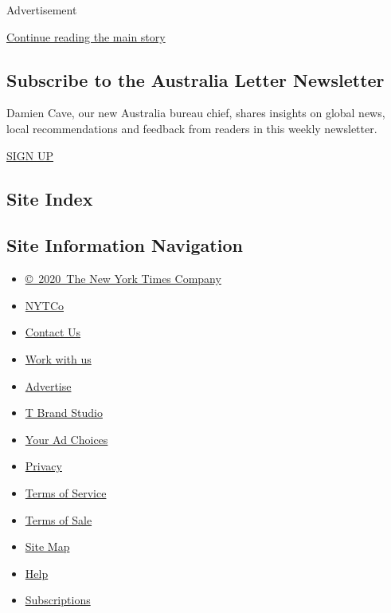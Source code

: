 Advertisement

\protect\hyperlink{after-mktg}{Continue reading the main story}

\hypertarget{subscribe-to-the-australia-letter-newsletter}{%
\subsection{Subscribe to the Australia Letter
Newsletter}\label{subscribe-to-the-australia-letter-newsletter}}

Damien Cave, our new Australia bureau chief, shares insights on global
news, local recommendations and feedback from readers in this weekly
newsletter.

\href{/newsletters/signup/AUST}{SIGN UP}

\hypertarget{site-index}{%
\subsection{Site Index}\label{site-index}}

\hypertarget{site-information-navigation}{%
\subsection{Site Information
Navigation}\label{site-information-navigation}}

\begin{itemize}
\tightlist
\item
  \href{https://help.nytimes.com/hc/en-us/articles/115014792127-Copyright-notice}{©~2020~The
  New York Times Company}
\end{itemize}

\begin{itemize}
\tightlist
\item
  \href{https://www.nytco.com/}{NYTCo}
\item
  \href{https://help.nytimes.com/hc/en-us/articles/115015385887-Contact-Us}{Contact
  Us}
\item
  \href{https://www.nytco.com/careers/}{Work with us}
\item
  \href{https://nytmediakit.com/}{Advertise}
\item
  \href{http://www.tbrandstudio.com/}{T Brand Studio}
\item
  \href{https://www.nytimes.com/privacy/cookie-policy\#how-do-i-manage-trackers}{Your
  Ad Choices}
\item
  \href{https://www.nytimes.com/privacy}{Privacy}
\item
  \href{https://help.nytimes.com/hc/en-us/articles/115014893428-Terms-of-service}{Terms
  of Service}
\item
  \href{https://help.nytimes.com/hc/en-us/articles/115014893968-Terms-of-sale}{Terms
  of Sale}
\item
  \href{https://spiderbites.nytimes.com}{Site Map}
\item
  \href{https://help.nytimes.com/hc/en-us}{Help}
\item
  \href{https://www.nytimes.com/subscription?campaignId=37WXW}{Subscriptions}
\end{itemize}

